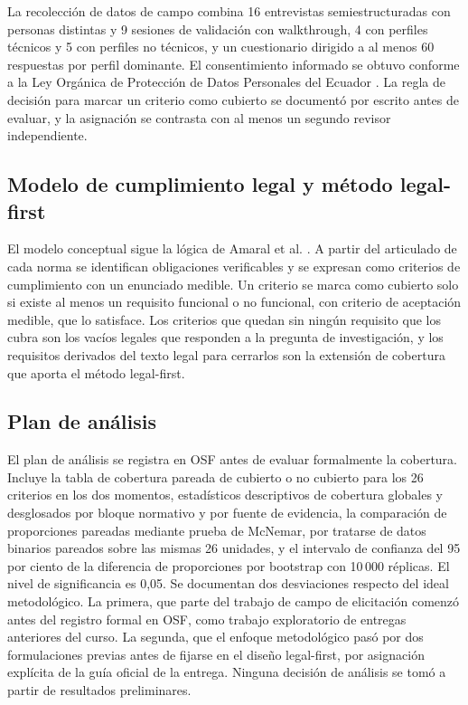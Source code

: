 \documentclass[pdflatex,sn-mathphys-num]{sn-jnl}
\begin{document}
La recolecci\'on de datos de campo combina 16 entrevistas semiestructuradas con personas distintas y 9 sesiones de validaci\'on con walkthrough, 4 con perfiles t\'ecnicos y 5 con perfiles no t\'ecnicos, y un cuestionario dirigido a al menos 60 respuestas por perfil dominante. El consentimiento informado se obtuvo conforme a la Ley Org\'anica de Protecci\'on de Datos Personales del Ecuador \cite{lopdp2021}. La regla de decisi\'on para marcar un criterio como cubierto se document\'o por escrito antes de evaluar, y la asignaci\'on se contrasta con al menos un segundo revisor independiente.

\subsection{Modelo de cumplimiento legal y m\'etodo legal-first}

El modelo conceptual sigue la l\'ogica de Amaral et al. \cite{amaral2021}. A partir del articulado de cada norma se identifican obligaciones verificables y se expresan como criterios de cumplimiento con un enunciado medible. Un criterio se marca como cubierto solo si existe al menos un requisito funcional o no funcional, con criterio de aceptaci\'on medible, que lo satisface. Los criterios que quedan sin ning\'un requisito que los cubra son los vac\'ios legales que responden a la pregunta de investigaci\'on, y los requisitos derivados del texto legal para cerrarlos son la extensi\'on de cobertura que aporta el m\'etodo legal-first.

\subsection{Plan de an\'alisis}

El plan de an\'alisis se registra en OSF \cite{nosek2018} antes de evaluar formalmente la cobertura. Incluye la tabla de cobertura pareada de cubierto o no cubierto para los 26 criterios en los dos momentos, estad\'isticos descriptivos de cobertura globales y desglosados por bloque normativo y por fuente de evidencia, la comparaci\'on de proporciones pareadas mediante prueba de McNemar, por tratarse de datos binarios pareados sobre las mismas 26 unidades, y el intervalo de confianza del 95 por ciento de la diferencia de proporciones por bootstrap con 10\,000 r\'eplicas. El nivel de significancia es 0{,}05. Se documentan dos desviaciones respecto del ideal metodol\'ogico. La primera, que parte del trabajo de campo de elicitaci\'on comenz\'o antes del registro formal en OSF, como trabajo exploratorio de entregas anteriores del curso. La segunda, que el enfoque metodol\'ogico pas\'o por dos formulaciones previas antes de fijarse en el dise\~no legal-first, por asignaci\'on expl\'icita de la gu\'ia oficial de la entrega. Ninguna decisi\'on de an\'alisis se tom\'o a partir de resultados preliminares.
\end{document}
